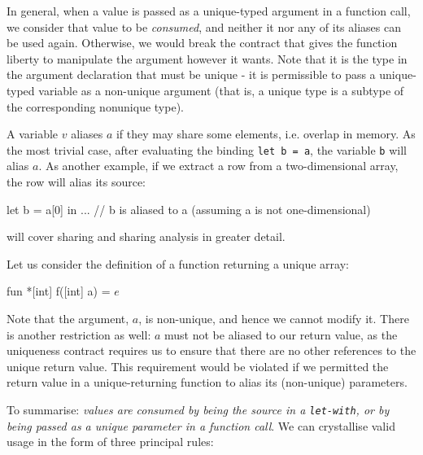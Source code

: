 \documentclass[oneside]{memoir}
\begin{document}
In general, when a value is passed as a unique-typed argument in a
function call, we consider that value to be \textit{consumed}, and
neither it nor any of its aliases can be used again.  Otherwise, we
would break the contract that gives the function liberty to manipulate
the argument however it wants.  Note that it is the type in the
argument declaration that must be unique - it is permissible to pass a
unique-typed variable as a non-unique argument (that is, a unique type
is a subtype of the corresponding nonunique type).

A variable $v$ aliases $a$ if they may share some elements,
i.e. overlap in memory.  As the most trivial case, after evaluating
the binding \texttt{let b = a}, the variable \texttt{b} will alias
\texttt{$a$}.  As another example, if we extract a row from a
two-dimensional array, the row will alias its source:
\begin{colorcode}
let b = a[0] in
... // b is aliased to a (assuming a is not one-dimensional)
\end{colorcode}
 will cover sharing and sharing analysis in
greater detail.

Let us consider the definition of a function returning a unique array:

\begin{colorcode}
fun *[int] f([int] a) = \(e\)
\end{colorcode}

Note that the argument, \texttt{$a$}, is non-unique, and hence we
cannot modify it.  There is another restriction as well: \texttt{$a$}
must not be aliased to our return value, as the uniqueness contract
requires us to ensure that there are no other references to the unique
return value.  This requirement would be violated if we permitted the
return value in a unique-returning function to alias its (non-unique)
parameters.

To summarise: \textit{values are consumed by being the source in a
  \texttt{let-with}, or by being passed as a \textit{unique} parameter
  in a function call}.  We can crystallise valid usage in the form of
three principal rules:
\end{document}
